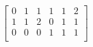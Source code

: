 \documentclass{article}
\begin{document}
 $
\left[
\begin{array}{c|c|c|c|c|c}
0 & 1 & 1 & 1 & 1 & 2 \\
1 & 1 & 2 & 0 & 1 & 1 \\
0 & 0 & 0 & 1 & 1 & 1 \\
\end{array}
\right] $
\end{document}
